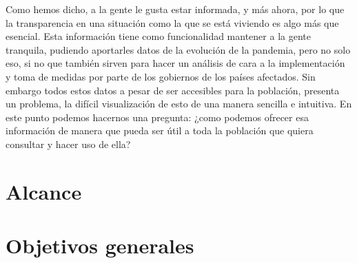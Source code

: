 Como hemos dicho, a la gente le gusta estar informada, y más ahora, por lo que la transparencia en una situación como la que se está viviendo es algo más que esencial. Esta información tiene como funcionalidad mantener a la gente tranquila, pudiendo aportarles datos de la evolución de la pandemia, pero no solo eso, si no que también sirven para hacer un análisis de cara a la implementación y toma de medidas por parte de los gobiernos de los países afectados. Sin embargo todos estos datos a pesar de ser accesibles para la población, presenta un problema, la difícil visualización de esto de una manera sencilla e intuitiva. En este punto podemos hacernos una pregunta: ¿como podemos ofrecer esa información de manera que pueda ser útil a toda la población que quiera consultar y hacer uso de ella?

\section{Alcance}

\section{Objetivos generales}